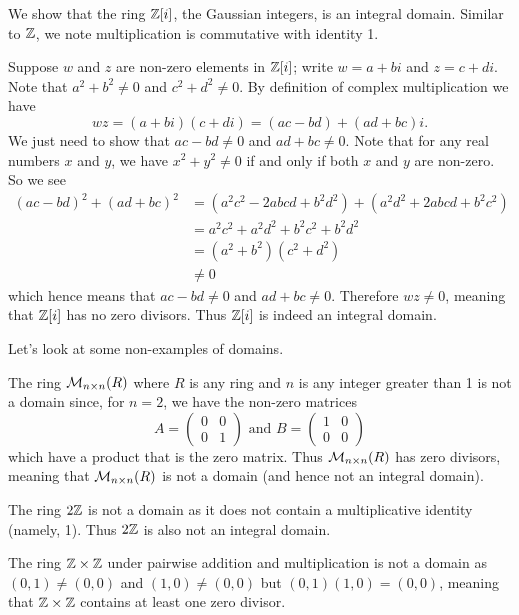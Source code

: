 \begin{example}
    We show that the ring $\mathbb{Z}[i]$, the Gaussian integers, is an integral domain. Similar to $\mathbb{Z}$, we note multiplication is commutative with identity 1.

    Suppose $w$ and $z$ are non-zero elements in $\mathbb{Z}[i]$; write $w = a+bi$ and $z = c+di$. Note that $a^2+b^2 \neq 0$ and $c^2 + d^2 \neq 0$. By definition of complex multiplication we have
    \[
        wz = (a+bi)(c+di) = (ac-bd) + (ad+bc)i.
    \]
    We just need to show that $ac-bd \neq 0$ and $ad+bc \neq 0$. Note that for any real numbers $x$ and $y$, we have $x^2 + y^2 \neq 0$ if and only if both $x$ and $y$ are non-zero. So we see
    \begin{align*}
        (ac-bd)^2 + (ad+bc)^2 &= (a^2c^2 - 2abcd + b^2d^2) + (a^2d^2 + 2abcd + b^2c^2)\\
        &= a^2c^2 + a^2d^2 + b^2c^2 + b^2d^2\\
        &= (a^2 + b^2)(c^2 + d^2)\\
        &\neq 0
    \end{align*}
    which hence means that $ac-bd \neq 0$ and $ad+bc \neq 0$. Therefore $wz \neq 0$, meaning that $\mathbb{Z}[i]$ has no zero divisors. Thus $\mathbb{Z}[i]$ is indeed an integral domain.
\end{example}

Let's look at some non-examples of domains.
\begin{example}
    The ring $\mathcal{M}_{n\times n}(R)$ where $R$ is any ring and $n$ is any integer greater than 1 is not a domain since, for $n = 2$, we have the non-zero matrices
    \[
        A = \begin{pmatrix}0&0\\0&1\end{pmatrix} \text{ and } B = \begin{pmatrix}1&0\\0&0\end{pmatrix}
    \]
    which have a product that is the zero matrix. Thus $\mathcal{M}_{n\times n}(R)$ has zero divisors, meaning that $\mathcal{M}_{n\times n}(R)$ is not a domain (and hence not an integral domain).
\end{example}
\begin{example}
    The ring $2\mathbb{Z}$ is not a domain as it does not contain a multiplicative identity (namely, 1). Thus $2\mathbb{Z}$ is also not an integral domain.
\end{example}
\begin{example}
    The ring $\mathbb{Z} \times \mathbb{Z}$ under pairwise addition and multiplication is not a domain as $(0,1) \neq (0, 0)$ and $(1, 0) \neq (0, 0)$ but $(0,1)(1,0) = (0, 0)$, meaning that $\mathbb{Z} \times \mathbb{Z}$ contains at least one zero divisor.
\end{example}

